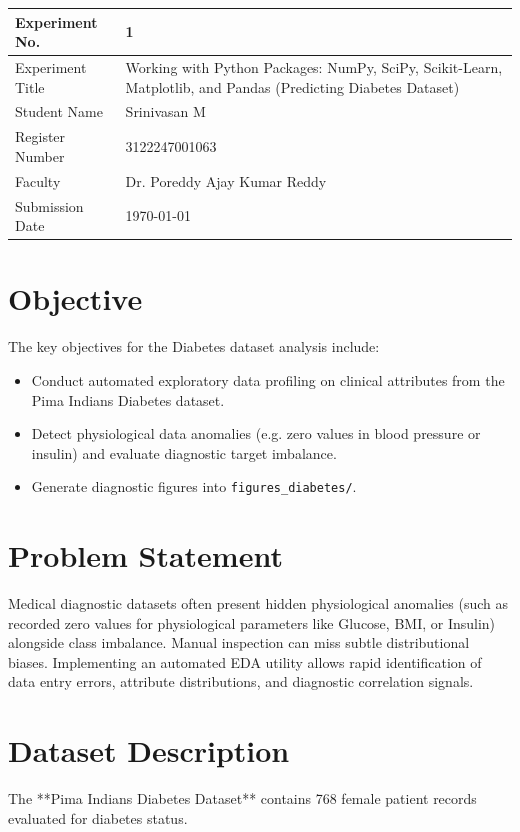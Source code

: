 \documentclass[12pt,a4paper]{article}
\begin{document}
\begin{tabular}{|p{4cm}|p{11cm}|}
\hline
Experiment No. & 1 \\ \hline
Experiment Title & Working with Python Packages: NumPy, SciPy, Scikit-Learn, Matplotlib, and Pandas (Predicting Diabetes Dataset) \\ \hline
Student Name & Srinivasan M \\ \hline
Register Number & 3122247001063 \\ \hline
Faculty & Dr. Poreddy Ajay Kumar Reddy \\ \hline
Submission Date & \today \\ \hline
\end{tabular}

\vspace{0.3cm}

\section{Objective}
The key objectives for the Diabetes dataset analysis include:
\begin{itemize}[noitemsep]
    \item Conduct automated exploratory data profiling on clinical attributes from the Pima Indians Diabetes dataset.
    \item Detect physiological data anomalies (e.g. zero values in blood pressure or insulin) and evaluate diagnostic target imbalance.
    \item Generate diagnostic figures into \texttt{figures\_diabetes/}.
\end{itemize}

\section{Problem Statement}
Medical diagnostic datasets often present hidden physiological anomalies (such as recorded zero values for physiological parameters like Glucose, BMI, or Insulin) alongside class imbalance. Manual inspection can miss subtle distributional biases. Implementing an automated EDA utility allows rapid identification of data entry errors, attribute distributions, and diagnostic correlation signals.

\section{Dataset Description}
The **Pima Indians Diabetes Dataset** contains 768 female patient records evaluated for diabetes status.
\end{document}
